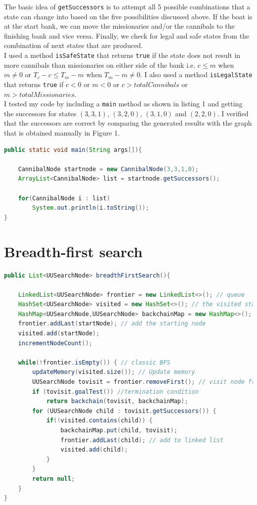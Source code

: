 \documentclass[9.5pt]{extarticle}
\begin{document}
The basic idea of \verb`getSuccessors` is to attempt all 5 possible combinations that a state can change into based on the five possibilities discussed above. If the boat is at the start bank, we can move the missionaries and/or the cannibals to the finishing bank and vice versa. Finally, we check for legal and safe states from the combination of next states that are produced.\\

I used a method \verb`isSafeState` that returns \verb`true` if the state does not result in more cannibals than missionaries on either side of the bank i.e. $c\leq m$ when $m \neq 0$ or $T_c - c \leq T_m - m$ when $T_m - m \neq 0$. I also used a method \verb`isLegalState` that returns \verb`true` if $c < 0$ or $ m < 0$ or $c > totalCannibals$ or $m > totalMissionaries$.\\

I tested my code by including a  \verb`main` method as shown in listing 1 and getting the successors for states $(3,3,1)$, $(3,2,0)$, $(3,1,0)$ and $(2,2,0)$. I verified that the successors are correct by comparing the generated results with the graph that is obtained manually in Figure 1.

\begin{lstlisting}[language=java,caption={Java code for testing}]
public static void main(String args[]){

	CannibalNode startnode = new CannibalNode(3,3,1,0);
	ArrayList<CannibalNode> list = startnode.getSuccessors();

	for(CannibalNode i : list) 
		System.out.println(i.toString());
}
\end{lstlisting}

\section{Breadth-first search}

\begin{lstlisting}[language=java,caption={Java code for BFS}]
public List<UUSearchNode> breadthFirstSearch(){

	LinkedList<UUSearchNode> frontier = new LinkedList<>(); // queue
	HashSet<UUSearchNode> visited = new HashSet<>(); // the visited states
	HashMap<UUSearchNode,UUSearchNode> backchainMap = new HashMap<>(); // backchaining map
	frontier.addLast(startNode); // add the starting node
	visited.add(startNode);
	incrementNodeCount();

	while(!frontier.isEmpty()) { // classic BFS
		updateMemory(visited.size()); // Update memory
		UUSearchNode tovisit = frontier.removeFirst(); // visit node from frontier
		if (tovisit.goalTest()) //termination condition
			return backchain(tovisit, backchainMap);
		for (UUSearchNode child : tovisit.getSuccessors()) {
			if(!visited.contains(child)) {
				backchainMap.put(child, tovisit);
				frontier.addLast(child); // add to linked list
				visited.add(child);
			}
		}
		return null;
	}
}
\end{lstlisting}
\end{document}
